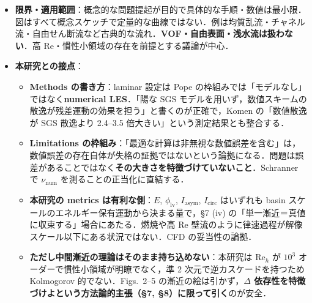 \documentclass[11pt]{jsarticle}
\begin{document}
\begin{itemize}
\begin{itemize}
    \item \textbf{$W$ と $U$ の関係は統計的でしかない}：解像速度場 $W$ はフィルタ済み $\bar{U}$ と等しくなり得ない（$\bar{U}$ はランダム場で将来発展が現在の状態で決まらない）．→a priori テストは疑わしい．
    \item \textbf{壁近傍は LES の弱点}：「粘性壁近傍領域には大きな渦は存在しない」（Bradshaw）．高 Re では壁近傍運動は解像できずモデル化が必須．LES が最も成功するのは\textbf{高 Re の自由せん断流}で，律速過程が解像された大スケールにある場合．
    \item 動的モデルの成功理由を「スケール相似性」ではなく\textbf{予測が $\Delta$ に依存しないようにする原理}から導き直し，標準的な $c_s$ の式（式 30）が本質的にそのまま得られることを示す（§10）．
  \end{itemize}
  \item \textbf{限界・適用範囲}：概念的な問題提起が目的で具体的な手順・数値は最小限．図はすべて概念スケッチで定量的な曲線ではない．例は均質乱流・チャネル流・自由せん断流など古典的な流れ．\textbf{VOF・自由表面・浅水流は扱わない}．高 Re・慣性小領域の存在を前提とする議論が中心．
  \item \textbf{本研究との接点}：
  \begin{itemize}
    \item \textbf{Methods の書き方}：laminar 設定は Pope の枠組みでは「モデルなし」ではなく\textbf{numerical LES}．「陽な SGS モデルを用いず，数値スキームの散逸が残差運動の効果を担う」と書くのが正確で，Komen の「数値散逸が SGS 散逸より 2.4--3.5 倍大きい」という測定結果とも整合する．
    \item \textbf{Limitations の枠組み}：「最適な計算は非無視な数値誤差を含む」は，数値誤差の存在自体が失格の証拠ではないという論拠になる．問題は誤差があることではなく\textbf{その大きさを特徴づけていないこと}．Schranner で $\nu_\mathrm{num}$ を測ることの正当化に直結する．
    \item \textbf{本研究の metrics は有利な側}：$E$, $\phi_\mathrm{lv}$, $I_\mathrm{asym}$, $I_\mathrm{circ}$ はいずれも basin スケールのエネルギー保有運動から決まる量で，§7 (iv) の「単一漸近＝真値に収束する」場合にあたる．燃焼や高 Re 壁流のように律速過程が解像スケール以下にある状況ではない．CFD の妥当性の論拠．
    \item \textbf{ただし中間漸近の理論はそのまま持ち込めない}：本研究は $\mathrm{Re}_h$ が $10^3$ オーダーで慣性小領域が明瞭でなく，準 2 次元で逆カスケードを持つため Kolmogorov 的でない．Figs.~2--5 の漸近の絵は引かず，\textbf{$\Delta$ 依存性を特徴づけよという方法論的主張（§7, §8）に限って引く}のが安全．

\end{itemize}
\end{itemize}
\end{document}
